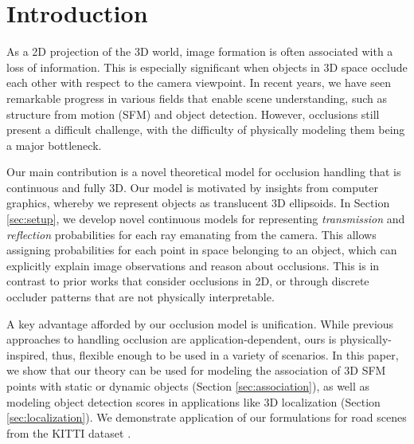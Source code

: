 \section{Introduction}


As a 2D projection of the 3D world, image formation is often associated with a loss of information. This is especially significant when objects in 3D space occlude each other with respect to the camera viewpoint. In recent years, we have seen remarkable progress in various fields that enable scene understanding, such as structure from motion (SFM) and object detection. However, occlusions still present a difficult challenge, with the difficulty of physically modeling them being a major bottleneck. 


Our main contribution is a novel theoretical model for occlusion handling that is continuous and fully 3D. Our model is motivated by insights from computer graphics, whereby we represent objects as translucent 3D ellipsoids. In Section \ref{sec:setup}, we develop novel continuous models for representing \emph{transmission} and \emph{reflection} probabilities for each ray emanating from the camera. This allows assigning probabilities for each point in space belonging to an object, which can explicitly explain image observations and reason about occlusions. This is in contrast to prior works that consider occlusions in 2D, or through discrete occluder patterns that are not physically interpretable.


A key advantage afforded by our occlusion model is unification. While previous approaches to handling occlusion are application-dependent, ours is physically-inspired, thus, flexible enough to be used in a variety of scenarios. In this paper, we show that our theory can be used for modeling the association of 3D SFM points with static or dynamic objects (Section \ref{sec:association}), as well as modeling object detection scores in applications like 3D localization (Section \ref{sec:localization}). We demonstrate application of our formulations for road scenes from the KITTI dataset \cite{Geiger_etal_2012}.


